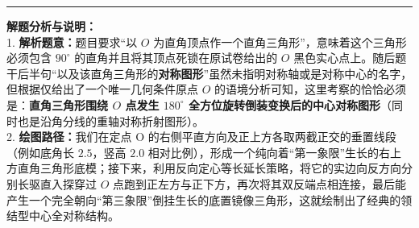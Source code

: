 \begin{center}
\end{center}

\vspace{0.6cm}
\hrule
\vspace{0.4cm}

{\small\color{gray}
\textbf{解题分析与说明：}\\
1. \textbf{解析题意：}题目要求“以 $O$ 为直角顶点作一个直角三角形”，意味着这个三角形必须包含 $90^\circ$ 的直角并且将其顶点死锁在原试卷给出的 $O$ 黑色实心点上。随后题干后半句“以及该直角三角形的\textbf{对称图形}”虽然未指明对称轴或是对称中心的名字，但根据仅给出了一个唯一几何条件原点 $O$ 的语境分析可知，这里考察的恰恰必须是：\textbf{直角三角形围绕 $O$ 点发生 $180^\circ$ 全方位旋转倒装变换后的中心对称图形}（同时也是沿角分线的重轴对称折射图形）。\\
2. \textbf{绘图路径：}我们在定点 O 的右侧平直方向及正上方各取两截正交的垂置线段（例如底角长 $2.5$，竖高 $2.0$ 相对比例），形成一个纯向着“第一象限”生长的右上方直角三角形底模；接下来，利用反向定心等长延长策略，将它的实边向反方向分别长驱直入探穿过 $O$ 点跑到正左方与正下方，再次将其双反端点相连接，最后能产生一个完全朝向“第三象限”倒挂生长的底置镜像三角形，这就绘制出了经典的领结型中心全对称结构。
}

